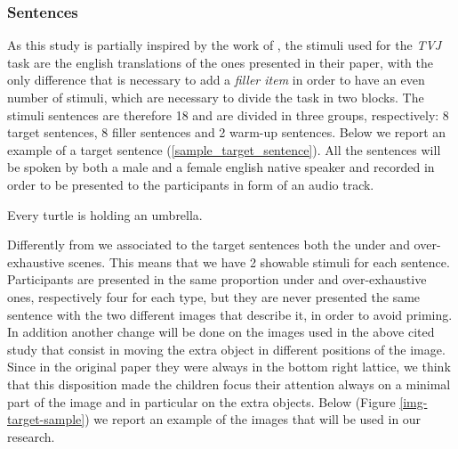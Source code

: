 \documentclass[10pt, a4]{article}
\begin{document}
\subsubsection{Sentences}
As this study is partially inspired by the work of \cite{minai2012hinders}, the stimuli used for the \textit{TVJ} task are the
english translations of the ones presented in their paper, with the only difference that is necessary to add a
\textit{filler item} in order to have an even number of stimuli, which are necessary to divide the task in two blocks.
The stimuli sentences are therefore 18 and are divided in three groups, respectively: 8 target sentences, 8 filler sentences
and 2 warm-up sentences. Below we report an example of a target sentence (\ref{sample_target_sentence}).
All the sentences will be spoken by both a male and a female english native speaker and
recorded in order to be presented to the participants in form of an audio track.

\begin{exe}
    \ex  Every turtle is holding an umbrella. \label{sample_target_sentence}
\end{exe}

Differently from \cite{minai2012hinders} we associated to the target sentences both the under and over-exhaustive scenes. This means
that we have 2 showable stimuli for each sentence. Participants are presented in the same proportion under and over-exhaustive ones,
respectively four for each type, but they are never presented the same sentence with the two different images that describe it, in order to avoid priming.
In addition another change will be done on the images used in the above cited study that consist in moving the extra object in different positions
of the image. Since in the original paper they were always in the bottom right lattice, we think that this disposition made the children focus their
attention always on a minimal part of the image and in particular on the extra objects. Below (Figure \ref{img-target-sample}) we report an example of the images that
will be used in our research.
\end{document}
